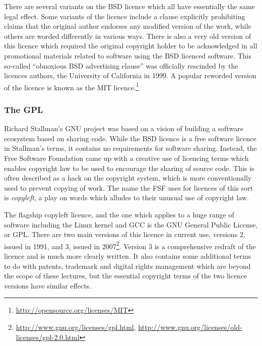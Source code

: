\documentclass[a4paper,12pt]{article}
\begin{document}
There are several variants on the BSD licence which all have essentially the
same legal effect. Some variants of the licence include a clause explicitly
prohibiting claims that the original author endorses any modified version of
the work, while others are worded differently in various ways. There is also
a very old version of this licence which required the original copyright
holder to be acknowledged in all promotional materials related to software
using the BSD licenced software. This so-called ``obnoxious BSD advertising
clause'' was officially rescinded by the licences authors, the University of
California in 1999. A popular reworded version of the licence is known as
the MIT licence.\footnote{\url{http://opensource.org/licenses/MIT}}

\subsubsection{The GPL}

Richard Stallman's GNU project was based on a vision of building a software
ecosystem based on sharing code. While the BSD licence is a free software
licence in Stallman's terms, it contains no requirements for software
sharing. Instead, the Free Software Foundation came up with a creative use
of licencing terms which enables copyright law to be used to encourage the
sharing of source code. This is often described as a hack on the copyright
system, which is more conventionally used to prevent copying of work. The
name the FSF uses for licences of this sort is \emph{copyleft}, a play on
words which alludes to their unusual use of copyright law.

The flagship copyleft licence, and the one which applies to a huge range of
software including the Linux kernel and GCC is the GNU General Public
License, or GPL. There are two main versions of this licence in current use,
versions 2, issued in 1991, and 3, issued in
2007\footnote{\url{http://www.gnu.org/licenses/gpl.html},
  \url{http://www.gnu.org/licenses/old-licenses/gpl-2.0.html}}. Version 3
is a comprehensive redraft of the licence and is much more clearly
written. It also contains some additional terms to do with patents,
trademark and digital rights management which are beyond the scope of these
lectures, but the essential copyright terms of the two licence versions have
similar effects.
\end{document}

